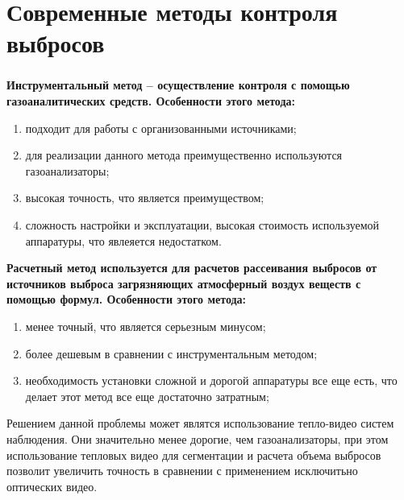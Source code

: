 \documentclass[t]{beamer}
\begin{document}
\section{Современные методы контроля выбросов}
	\begin{frame}
		\frametitle{\insertsection} 
		\bfseries Инструментальный метод \normalfont -- осуществление контроля с помощью газоаналитических средств. Особенности этого метода:
		\begin{enumerate}
			\justifying
			\item подходит для работы с организованными источниками;
			\item для реализации данного метода преимущественно используются газоанализаторы;
			\item высокая точность, что является преимуществом;
			\item сложность настройки и эксплуатации, высокая стоимость используемой аппаратуры, что явлеяется недостатком.
		\end{enumerate}
	\end{frame}
	
	\begin{frame}
		\bfseries Расчетный метод \normalfont используется для расчетов рассеивания выбросов от источников выброса загрязняющих атмосферный воздух веществ с помощью формул. Особенности этого метода:
		\begin{enumerate}
			\justifying
			\item менее точный, что является серьезным минусом;
			\item более дешевым в сравнении с инструментальным методом; 
			\item необходимость установки сложной и дорогой аппаратуры все еще есть, что делает этот метод все еще достаточно затратным;
		\end{enumerate}
		
		Решением данной проблемы может являтся использование тепло-видео систем наблюдения. Они значительно менее дорогие, чем газоанализаторы, при этом использование тепловых видео для сегментации и расчета объема выбросов позволит увеличить точность в сравнении с применением исключитьно оптических видео.
	\end{frame}

%		
\end{document}
